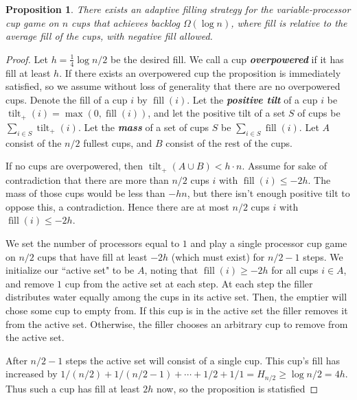 \documentclass[twocolumn]{article}[11pt]
\newcommand{\defn}[1]{{\textit{\textbf{\boldmath #1}}}}
\renewcommand{\paragraph}[1]{\vspace{0.09in}\noindent{\bf \boldmath #1.}}
\DeclareMathOperator{\tilt}{\text{tilt}}
\DeclareMathOperator{\fil}{\text{fill}}
\newtheorem{proposition}{Proposition}
\begin{document}
\paragraph{Adaptive Lowerbound}
\begin{proposition}
\label{prop:adaptiveBase}
  There exists an adaptive filling strategy for the variable-processor cup game
  on $n$ cups that achieves backlog $\Omega(\log n)$, where fill is relative to
  the average fill of the cups, with negative fill allowed.
\end{proposition}
\begin{proof}
  Let $h = \frac{1}{4}\log n/2$ be the desired fill. We call a cup
  \defn{overpowered} if it has fill at least $h$. If there exists an
  overpowered cup the proposition is immediately satisfied, so we assume
  without loss of generality that there are no overpowered cups. Denote the
  fill of a cup $i$ by $\fil(i)$. Let the \defn{positive tilt} of a cup $i$ be
  $\tilt_+(i) = \max(0, \fil(i))$, and let the positive tilt of a set $S$ of
  cups be $\sum_{i\in S} \tilt_+(i)$. Let the \defn{mass} of a set of cups $S$
  be $\sum_{i\in S} \fil(i)$. Let $A$ consist of the $n/2$ fullest cups, and
  $B$ consist of the rest of the cups.

  If no cups are overpowered, then $\tilt_+(A\cup B) < h\cdot n$. Assume for
  sake of contradiction that there are more than $n/2$ cups $i$ with $\fil(i)
  \le -2h$. The mass of those cups would be less than $-hn $, but there isn't
  enough positive tilt to oppose this, a contradiction. Hence there are at most
  $n/2$ cups $i$ with $\fil(i) \le -2h$. 

  We set the number of processors equal to $1$ and play a single processor cup
  game on $n/2$ cups that have fill at least $-2h$ (which must exist) for $n/2
  -1$ steps. We initialize our ``active set" to be $A$, noting that $\fil(i)
  \ge -2h$ for all cups $i\in A$, and remove $1$ cup from the active set at
  each step.
  At each step the filler distributes water equally among the cups in its
  active set. Then, the emptier will chose some cup to empty from. If this cup
  is in the active set the filler removes it from the active set. Otherwise, the
  filler chooses an arbitrary cup to remove from the active set.

  After $n/2-1$ steps the active set will consist of a single cup. This cup's
  fill has increased by $1/(n/2) + 1/(n/2 - 1) + \cdots + 1/2 + 1/1 = H_{n/2}
  \ge \log n/2 = 4h$. Thus such a cup has fill at least $2h$ now, so the
  proposition is statisfied
\end{proof}
\end{document}
